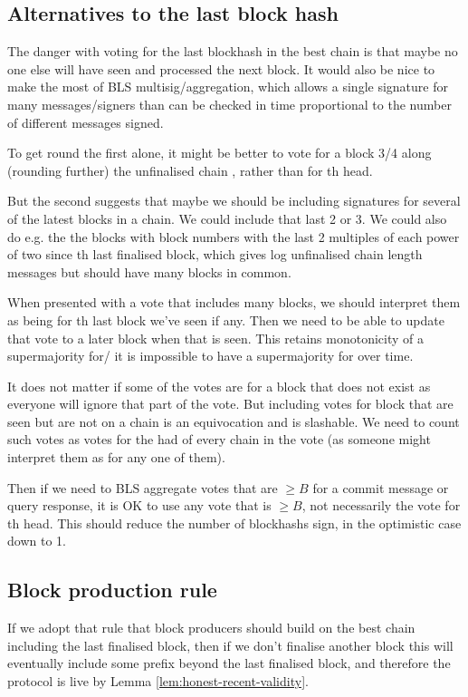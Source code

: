 \documentclass{article}
\begin{document}
\subsection{Alternatives to the last block hash}

The danger with voting for the last blockhash in the best chain is that maybe no one else will have seen and processed the next block. It would also be nice to make the most of BLS multisig/aggregation, which allows a single signature for many messages/signers than can be checked in time proportional to the number of different messages signed. 

To get round the first alone, it might be better to vote for a block 3/4 along (rounding further) the unfinalised chain , rather than for th head.

But the second suggests that maybe we should be including signatures for several of the latest blocks in a chain. We could include that last 2 or 3. We could also do e.g. the the blocks with block numbers with the last 2 multiples of each power of two since th last finalised block, which gives log unfinalised chain length messages but should have many blocks in common.

When presented with a vote that includes many blocks, we should interpret them as being for th last block we've seen if any. Then we need to be able to update that vote to a later block when that is seen. This retains monotonicity of a supermajority for/ it is impossible to have a supermajority for over time.

It does not matter if some of the votes are for a block that does not exist as everyone will ignore that part of the vote. But including votes for block that are seen but are not on a chain is an equivocation and is slashable. We need to count such votes as votes for the had of every chain in the vote (as someone might interpret them as for any one of them).

Then if we need to BLS aggregate votes that are $\geq B$ for a commit message or query response, it is OK to use any vote that is $\geq B$, not necessarily the vote for th head. This should reduce the number of blockhashs sign, in the optimistic case down to 1.

\subsection{  Block production rule}

If we adopt that rule that block producers should build on the best chain including the last finalised block, then if we don't finalise another block this will eventually include some prefix  beyond the last finalised block, and therefore the protocol is live by Lemma \ref{lem:honest-recent-validity}.
\end{document}
